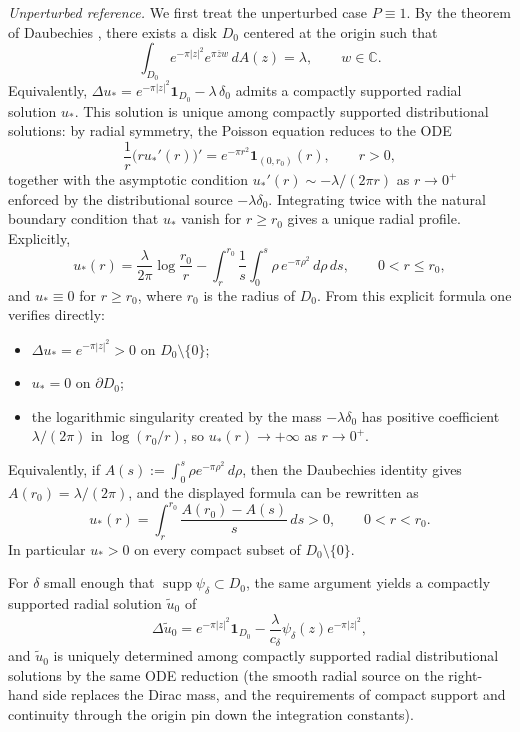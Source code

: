 \documentclass[a4paper,11pt,reqno]{amsart}
\numberwithin{equation}{section}
\theoremstyle{plain} %
\theoremstyle{definition} %
\theoremstyle{remark}
\DeclareMathOperator{\supp}{supp}
\newcommand{\C}{\mathbb{C}}
\begin{document}
\smallskip
\emph{Unperturbed reference.} We first treat the unperturbed case $P\equiv 1$. By the theorem of Daubechies \cite{Daubechies}, there exists a disk $D_0$ centered at the origin such that
\[
\int_{D_0} e^{-\pi|z|^2}e^{\pi \overline z w}\,dA(z)=\lambda,
\qquad w\in\C.
\]
Equivalently, $\Delta u_*=e^{-\pi|z|^2}\mathbf 1_{D_0}-\lambda\,\delta_0$ admits a compactly supported radial solution $u_*$. This solution is unique among compactly supported distributional solutions: by radial symmetry, the Poisson equation reduces to the ODE
\[
\frac{1}{r}\big(r u_*'(r)\big)'=e^{-\pi r^2}\mathbf 1_{(0,r_0)}(r),\qquad r>0,
\]
together with the asymptotic condition $u_*'(r)\sim -\lambda/(2\pi r)$ as $r\to 0^+$ enforced by the distributional source \(-\lambda\delta_0\). Integrating twice with the natural boundary condition that $u_*$ vanish for $r\ge r_0$ gives a unique radial profile. Explicitly,
\[
u_*(r)=\frac{\lambda}{2\pi}\log\frac{r_0}{r}-\int_r^{r_0}\frac{1}{s}\int_0^{s}\rho\,e^{-\pi\rho^2}\,d\rho\,ds,
\qquad 0<r\le r_0,
\]
and $u_*\equiv 0$ for $r\ge r_0$, where $r_0$ is the radius of $D_0$. From this explicit formula one verifies directly:
\begin{itemize}
\item $\Delta u_*=e^{-\pi|z|^2}>0$ on $D_0\setminus\{0\}$;
\item $u_*=0$ on $\partial D_0$;
\item the logarithmic singularity created by the mass \(-\lambda\delta_0\) has positive coefficient $\lambda/(2\pi)$ in \(\log(r_0/r)\), so $u_*(r)\to+\infty$ as $r\to 0^+$.
\end{itemize}
Equivalently, if \(A(s):=\int_0^s \rho e^{-\pi\rho^2}\,d\rho\), then the
Daubechies identity gives \(A(r_0)=\lambda/(2\pi)\), and the displayed formula
can be rewritten as
\[
u_*(r)=\int_r^{r_0}\frac{A(r_0)-A(s)}{s}\,ds>0,
\qquad 0<r<r_0.
\]
In particular \(u_*>0\) on every compact subset of \(D_0\setminus\{0\}\).

For $\delta$ small enough that $\supp\psi_\delta\subset D_0$, the same argument yields a compactly supported radial solution $\widetilde u_0$ of
\begin{equation}\label{eq:unperturbed-free-boundary-new}
\Delta \widetilde u_0
=
e^{-\pi|z|^2}\mathbf{1}_{D_0}
-\frac{\lambda}{c_\delta}\psi_\delta(z)e^{-\pi|z|^2},
\end{equation}
and $\widetilde u_0$ is uniquely determined among compactly supported radial distributional solutions by the same ODE reduction (the smooth radial source on the right-hand side replaces the Dirac mass, and the requirements of compact support and continuity through the origin pin down the integration constants).
\end{document}
